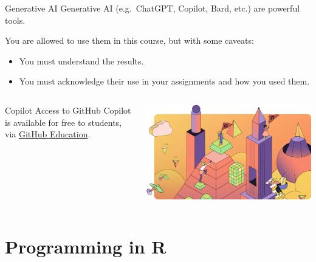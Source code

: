 \documentclass[
  ignorenonframetext,
  aspectratio=1610,
  onlytextwidth]{beamer}
\providecommand{\tightlist}{}
\begin{document}
\begin{frame}{Generative AI}
\label{generative-ai}
Generative AI (e.g.~ChatGPT, Copilot, Bard, etc.) are powerful tools.

\bigskip

\pause

You are allowed to use them in this course, but with some caveats:

\begin{itemize}
\tightlist
\item
  You must understand the results.
\item
  You must acknowledge their use in your assignments and how you used
  them.
\end{itemize}

\pause

\bigskip

\begin{columns}[T]
\begin{column}{0.47\linewidth}
\begin{block}{Copilot}
\label{copilot}
Access to GitHub Copilot is available for free to students, via
\href{https://education.github.com}{GitHub Education}.
\end{block}
\end{column}

\begin{column}{0.47\linewidth}
\includegraphics[width=1\linewidth,height=\textheight,keepaspectratio]{../assets/images/github-education.png}
\end{column}
\end{columns}
\end{frame}

\section{Programming in R}\label{programming-in-r}
\end{document}
